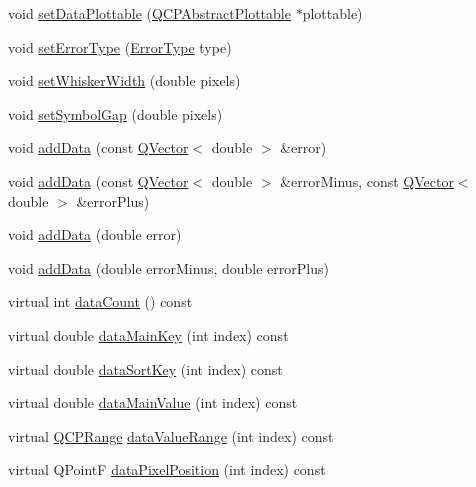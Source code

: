 \begin{DoxyCompactItemize}
\item 
void \hyperlink{class_q_c_p_error_bars_aabb42a964cfbf780cd1c79850c7cd989}{set\+Data\+Plottable} (\hyperlink{class_q_c_p_abstract_plottable}{Q\+C\+P\+Abstract\+Plottable} $\ast$plottable)
\item 
void \hyperlink{class_q_c_p_error_bars_af0af493d454a8f3a0908830160680d2b}{set\+Error\+Type} (\hyperlink{class_q_c_p_error_bars_a95f0220f11a72648b96480a85ce26474}{Error\+Type} type)
\item 
void \hyperlink{class_q_c_p_error_bars_ad05f6ff9e46c6047f1cd2459744b7b59}{set\+Whisker\+Width} (double pixels)
\item 
void \hyperlink{class_q_c_p_error_bars_a280ee8d863d8a2630c309701d019b3de}{set\+Symbol\+Gap} (double pixels)
\item 
void \hyperlink{class_q_c_p_error_bars_aae296ad9817b3fa418db284af81cecf8}{add\+Data} (const \hyperlink{class_q_vector}{Q\+Vector}$<$ double $>$ \&error)
\item 
void \hyperlink{class_q_c_p_error_bars_a2135cf41d7925a3dcdadd4eb03fd3eb6}{add\+Data} (const \hyperlink{class_q_vector}{Q\+Vector}$<$ double $>$ \&error\+Minus, const \hyperlink{class_q_vector}{Q\+Vector}$<$ double $>$ \&error\+Plus)
\item 
void \hyperlink{class_q_c_p_error_bars_a39ef73b0e61941fc4064fd3a5224c72a}{add\+Data} (double error)
\item 
void \hyperlink{class_q_c_p_error_bars_a1833c5de9c2fe2952b977505d9f27cd1}{add\+Data} (double error\+Minus, double error\+Plus)
\item 
virtual int \hyperlink{class_q_c_p_error_bars_ad8811b034a17cb4ef898cbcc8da29bd2}{data\+Count} () const
\item 
virtual double \hyperlink{class_q_c_p_error_bars_ae3931213f76cd34a824c42c22a1dca74}{data\+Main\+Key} (int index) const
\item 
virtual double \hyperlink{class_q_c_p_error_bars_a1ef91328ad7dde84695958139d5f40cf}{data\+Sort\+Key} (int index) const
\item 
virtual double \hyperlink{class_q_c_p_error_bars_a88cd90280366b44c2159774bfb7c473a}{data\+Main\+Value} (int index) const
\item 
virtual \hyperlink{class_q_c_p_range}{Q\+C\+P\+Range} \hyperlink{class_q_c_p_error_bars_a09b99cf293b6041ae8d5c52cf8dd599c}{data\+Value\+Range} (int index) const
\item 
virtual Q\+PointF \hyperlink{class_q_c_p_error_bars_a7397bc40751c9c6e2ea188895b2152f8}{data\+Pixel\+Position} (int index) const

\end{DoxyCompactItemize}
